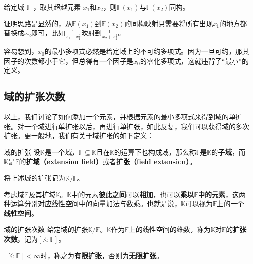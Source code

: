  


\begin{theorem}{}
给定域 $\mathbb{F}$ ，取其超越元素 $x_1$和$x_2$，则$\mathbb{F}(x_1)$与$\mathbb{F}(x_2)$同构。
\end{theorem}

证明思路是显然的，从$\mathbb{F}(x_1)$到$\mathbb{F}(x_2)$的同构映射只需要将所有出现$x_1$的地方都替换成$x_2$即可，比如$\frac{1}{x_1+x_1^2}$映射到$\frac{1}{x_2+x_2^2}$。

容易想到，$x_0$的最小多项式必然是给定域上的不可约多项式。因为一旦可约，那其因子的次数都小于它，但总得有一个因子是$x_0$的零化多项式，这就违背了“最小”的定义。




\subsection{域的扩张次数}

以上，我们讨论了如何添加一个元素，并根据元素的最小多项式来得到域的单扩张。对一个域进行单扩张以后，再进行单扩张，如此反复，我们可以获得域的多次扩张。更一般地，我们有关于域扩张的如下定义：

\begin{definition}{域的扩张}
设$\mathbb{K}$是一个域，$\mathbb{F}\subseteq \mathbb{K}$且在$\mathbb{K}$的运算下也构成域，那么称$\mathbb{F}$是$\mathbb{K}$的\textbf{子域}，而$\mathbb{K}$是$\mathbb{F}$的\textbf{扩域（extension field）}或者\textbf{扩张（field extension）}。

将上述域的扩张记为$\mathbb{K}/\mathbb{F}$。
\end{definition}

考虑域$\mathbb{F}$及其扩域$\mathbb{K}$。$\mathbb{K}$中的元素\textbf{彼此之间}可以\textbf{相加}，也可以\textbf{乘以}$\mathbb{F}$\textbf{中的元素}，这两种运算分别对应线性空间中的向量加法与数乘。也就是说，$\mathbb{K}$可以视为$\mathbb{F}$上的一个\textbf{线性空间}。

\begin{definition}{域的扩张次数}
给定域的扩张$\mathbb{K}/\mathbb{F}$。$\mathbb{K}$作为$\mathbb{F}$上的线性空间的维数，称为$\mathbb{K}$对$\mathbb{F}$的\textbf{扩张次数}，记为$[\mathbb{K}:\mathbb{F}]$。

$[\mathbb{K}:\mathbb{F}]<\infty$时，称之为\textbf{有限扩张}，否则为\textbf{无限扩张}。
\end{definition}


